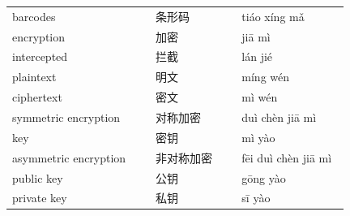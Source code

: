 \documentclass[11pt]{article}
\begin{document}
\begin{longtable}{@{}p{0.40\linewidth}p{0.24\linewidth}p{0.30\linewidth}@{}}
barcodes & 条形码 & tiáo xíng mǎ \\
encryption & 加密 & jiā mì \\
intercepted & 拦截 & lán jié \\
plaintext & 明文 & míng wén \\
ciphertext & 密文 & mì wén \\
symmetric encryption & 对称加密 & duì chèn jiā mì \\
key & 密钥 & mì yào \\
asymmetric encryption & 非对称加密 & fēi duì chèn jiā mì \\
public key & 公钥 & gōng yào \\
private key & 私钥 & sī yào \\
\end{longtable}
\end{document}
